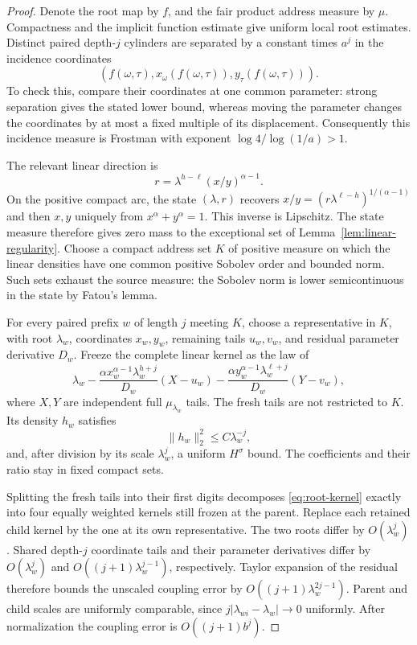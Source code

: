 \documentclass[11pt,a4paper]{amsart}
\numberwithin{equation}{section}
\theoremstyle{definition}
\begin{document}
\begin{proof}
Denote the root map by \(f\), and the fair product address measure
by \(\mu\). Compactness and the implicit function estimate give
uniform local root estimates. Distinct paired depth-\(j\)
cylinders are separated by a constant times \(a^j\) in the
incidence coordinates
\[
(f(\omega,\tau),x_\omega(f(\omega,\tau)),
                       y_\tau(f(\omega,\tau))).
\]
To check this, compare their coordinates at one common parameter:
strong separation gives the stated lower bound, whereas moving
the parameter changes the coordinates by at most a fixed multiple
of its displacement. Consequently this incidence measure is
Frostman with exponent \(\log4/\log(1/a)>1\).

The relevant linear direction is
\[
r=\lambda^{h-\ell}(x/y)^{\alpha-1}.
\]
On the positive compact arc, the state \((\lambda,r)\) recovers
\(x/y=(r\lambda^{\ell-h})^{1/(\alpha-1)}\) and then \(x,y\) uniquely
from \(x^\alpha+y^\alpha=1\). This inverse is Lipschitz. The state measure
therefore gives zero mass to the exceptional set of
Lemma~\ref{lem:linear-regularity}.
Choose a compact address set \(K\) of positive measure on which
the linear densities have one common positive Sobolev order and
bounded norm. Such sets exhaust the source measure: the Sobolev
norm is lower semicontinuous in the state by Fatou's lemma.

For every paired prefix \(w\) of length \(j\) meeting \(K\),
choose a representative in \(K\), with root \(\lambda_w\),
coordinates \(x_w,y_w\), remaining tails \(u_w,v_w\), and residual
parameter derivative \(D_w\). Freeze the complete linear kernel
as the law of
\begin{equation}
\lambda_w-\frac{\alpha x_w^{\alpha-1}\lambda_w^{h+j}}{D_w}(X-u_w)
           -\frac{\alpha y_w^{\alpha-1}\lambda_w^{\ell+j}}{D_w}(Y-v_w),
\label{eq:root-kernel}
\end{equation}
where \(X,Y\) are independent full \(\mu_{\lambda_w}\) tails.
The fresh tails are not restricted to \(K\). Its density \(h_w\)
satisfies
\begin{equation}
\|h_w\|_2^2\leq C\lambda_w^{-j},
\label{eq:kernel-l2}
\end{equation}
and, after division by its scale \(\lambda_w^j\), a uniform
\(H^\sigma\) bound. The coefficients and their ratio stay in
fixed compact sets.

Splitting the fresh tails into their first digits decomposes
\eqref{eq:root-kernel} exactly into four equally weighted kernels
still frozen at the parent. Replace each retained child kernel
by the one at its own representative. The two roots differ by
\(O(\lambda_w^j)\). Shared depth-\(j\) coordinate tails and their
parameter derivatives differ by \(O(\lambda_w^j)\) and
\(O((j+1)\lambda_w^{j-1})\), respectively. Taylor expansion of
the residual therefore bounds the unscaled coupling error by
\(O((j+1)\lambda_w^{2j-1})\). Parent and child scales are uniformly
comparable, since \(j|\lambda_{wi}-\lambda_w|\to0\) uniformly.
After normalization the coupling error is \(O((j+1)b^j)\).


\end{proof}
\end{document}
